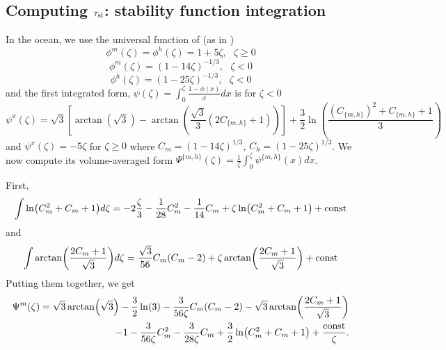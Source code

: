 \subsection{Computing $\tau_{\rm sl}$: stability function integration}
\label{sec:ND_Ocean_stabilityFunctionIntegration}
In the ocean, we use the universal function of \citep{large2019similarity} (as in \citep{pelletier2021two})
\begin{equation}
	\phi^m(\zeta) = \phi^h(\zeta) = 1+5\zeta, ~~~ \zeta \geq 0
\end{equation}
\begin{equation}
	\phi^m(\zeta) = (1-14\zeta)^{-1/3}, ~~~ \zeta < 0
\end{equation}
\begin{equation}
	\phi^h(\zeta) = (1-25\zeta)^{-1/3}, ~~~ \zeta < 0
\end{equation}
and the first integrated form, $\psi(\zeta)= \int_0^\zeta \frac{1-\phi(x)}{x}dx$ is for $\zeta<0$
\begin{equation}
	\psi^x(\zeta)  = \sqrt{3}\left[\arctan(\sqrt{3}) -
	\arctan\left(\frac{\sqrt{3}}{3}(2C_{\{m,h\}}+1)\right)\right]
	+ \frac{3}{2}\ln \left(\frac{(C_{\{m,h\}})^2 + C_{\{m,h\}} + 1}{3}\right)
\end{equation}
and $\psi^x(\zeta) = -5\zeta$ for $\zeta \geq 0$
where $C_m = (1-14\zeta)^{1/3}$, $C_h = (1-25\zeta)^{1/3}$.
We now compute its volume-averaged form $\Psi^{\{m,h\}}(\zeta)= \frac{1}{\zeta}\int_0^\zeta \psi^{\{m,h\}}(x)dx$.
\par
First,
\begin{equation}
	\int \ln (C_m^2+C_m+1)d\zeta
	= -2 \frac{\zeta}{3} - \frac{1}{28}C_m^2 - \frac{1}{14}C_m
	+\zeta\ln (C_m^2+C_m+1) + {\rm const}
\end{equation}
and
\begin{equation}
	\int \arctan (\frac{2C_m+1}{\sqrt{3}})d\zeta
	= \frac{\sqrt{3}}{56}C_m(C_m-2)
	+ \zeta \arctan (\frac{2C_m+1}{\sqrt{3}}) + {\rm const}
\end{equation}
Putting them together, we get
\begin{equation}
\begin{aligned}
	\Psi^m(\zeta)=\sqrt{3}\arctan(\sqrt{3})- 
	\frac{3}{2}\ln(3) -
	\frac{3}{56\zeta}C_m(C_m-2)
	- \sqrt{3} \arctan (\frac{2C_m+1}{\sqrt{3}})
	\\
	-1 - \frac{3}{56\zeta}C_m^2 - \frac{3}{28\zeta}C_m
	+\frac{3}{2}\ln (C_m^2+C_m+1)
	+ \frac{{\rm const}}{\zeta}.
\end{aligned}
\end{equation}
